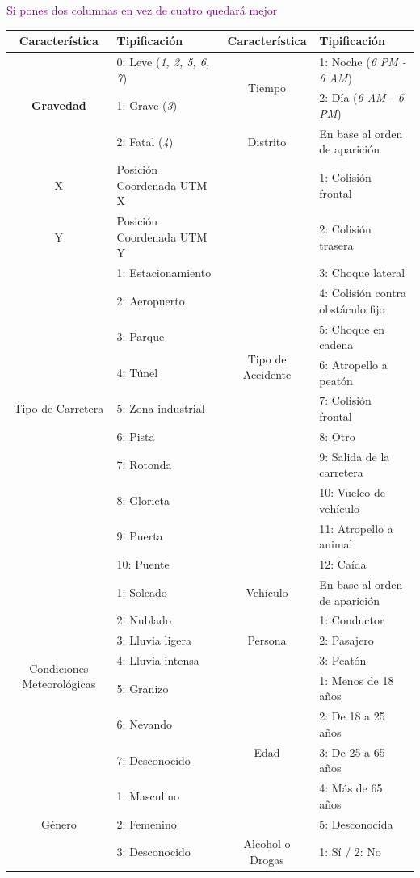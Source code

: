 \textcolor{purple}{Si pones dos columnas en vez de cuatro quedará mejor}
\begin{table}[ht]
	\centering
	\renewcommand{\arraystretch}{1.2}
	\small
	
	\begin{tabular}{|c|l|c|l|}\hline
		\textbf{Característica} & \textbf{Tipificación} & \textbf{Característica} & \textbf{Tipificación} \\ \hline
		\multirow{3}{*}{\textbf{Gravedad}} & 0: Leve (\textit{1, 2, 5, 6, 7}) & \multirow{2}{*}{Tiempo} & 1: Noche (\textit{6 PM - 6 AM}) \\
		& 1: Grave (\textit{3}) & & 2: Día (\textit{6 AM - 6 PM}) \\ \cline{3-4}
		& 2: Fatal (\textit{4}) & Distrito & En base al orden de aparición \\ \hline
		\multirow{1}{*}{X} & Posición Coordenada UTM X & \multirow{12}{*}{Tipo de Accidente} & 1: Colisión frontal \\ \cline{1-2}
		\multirow{1}{*}{Y} & Posición Coordenada UTM Y & & 2: Colisión trasera \\ \cline{1-2}
		\multirow{9}{*}{Tipo de Carretera} & 1: Estacionamiento & & 3: Choque lateral \\
		& 2: Aeropuerto & & 4: Colisión contra obstáculo fijo \\
		& 3: Parque & & 5: Choque en cadena \\
		& 4: Túnel & & 6: Atropello a peatón \\
		& 5: Zona industrial & & 7: Colisión frontal \\
		& 6: Pista & & 8: Otro \\
		& 7: Rotonda & & 9: Salida de la carretera \\
		& 8: Glorieta & & 10: Vuelco de vehículo \\
		& 9: Puerta & & 11: Atropello a animal \\
		& 10: Puente & & 12: Caída \\ \hline
		\multirow{7}{*}{Condiciones Meteorológicas} & 1: Soleado & \multirow{1}{*}{Vehículo} & En base al orden de aparición \\ \cline{3-4}
		& 2: Nublado & \multirow{3}{*}{Persona} & 1: Conductor \\
		& 3: Lluvia ligera & & 2: Pasajero \\
		& 4: Lluvia intensa & & 3: Peatón \\ \cline{3-4}
		& 5: Granizo & \multirow{5}{*}{Edad} & 1: Menos de 18 años \\
		& 6: Nevando & & 2: De 18 a 25 años \\
		& 7: Desconocido & & 3: De 25 a 65 años \\ \cline{1-2}
		\multirow{3}{*}{Género} & 1: Masculino & & 4: Más de 65 años \\
		& 2: Femenino & & 5: Desconocida \\ \cline{3-4}
		& 3: Desconocido & \multirow{1}{*}{Alcohol o Drogas} & 1: Sí / 2: No\\ \hline
	\end{tabular}
	

\end{table}
